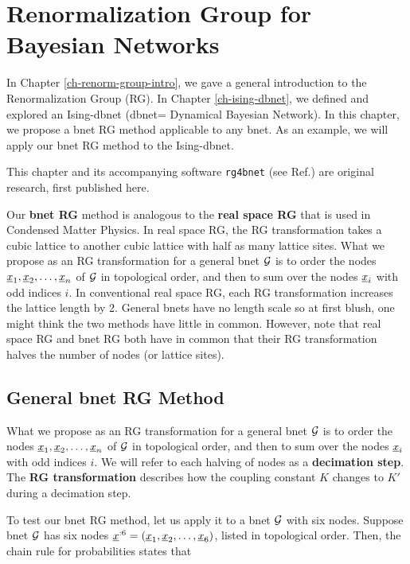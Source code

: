 
\chapter{Renormalization Group for
Bayesian Networks}
\label{ch-renorm-group-bnets}

In Chapter \ref{ch-renorm-group-intro},
we gave a general introduction to the
Renormalization Group (RG).
In Chapter \ref{ch-ising-dbnet},
we defined and explored an Ising-dbnet (dbnet= Dynamical
Bayesian Network).
In this chapter,
we propose a bnet RG method
applicable to
any bnet.
As an example,
we will
apply our bnet RG method
to the Ising-dbnet.

This chapter and its accompanying software 
{\tt rg4bnet} (see Ref.\cite{rg4bnets}) are original research, first published here.


Our {\bf bnet RG} method  is analogous
to the {\bf real space RG} that  is
used in Condensed Matter Physics. In real space RG,
the RG transformation
takes a cubic lattice
to another cubic lattice
with half as many lattice sites.
What we propose as an RG transformation
for a general bnet ${\cal G}$
is to order the nodes $\rvx_1, \rvx_2, \ldots,\rvx_n$
of ${\cal G}$ in topological order, and 
then to sum over the nodes $\rvx_i$
with odd
indices  $i$.
In conventional real space
RG, each RG transformation
increases the lattice length
by 2. General
bnets have no length scale
so at first blush, one might think the two methods have little in common.
However, note that real space
RG and bnet RG
both have in common that
their RG transformation
halves the number of nodes (or
lattice sites).

\section{General bnet RG Method}

What we propose as an RG transformation
for a general bnet ${\cal G}$
is to order the nodes $\rvx_1, \rvx_2, \ldots,\rvx_n$
of ${\cal G}$ in topological order, and 
then to sum over the nodes $\rvx_i$
with odd indices $i$.
We will refer to each
halving of nodes as a 
{\bf  decimation step}.
The {\bf RG transformation}
describes how the coupling
constant $K$ changes to $K'$
during a decimation step.


To test our bnet RG method, let us apply it to
a bnet ${\cal G}$
with six nodes. 
Suppose bnet ${\cal G}$
has six nodes $\rvx^{:6}=
(\rvx_1, \rvx_2, \ldots, \rvx_6)$,
listed in topological
order. Then, the chain
rule for probabilities 
states that






